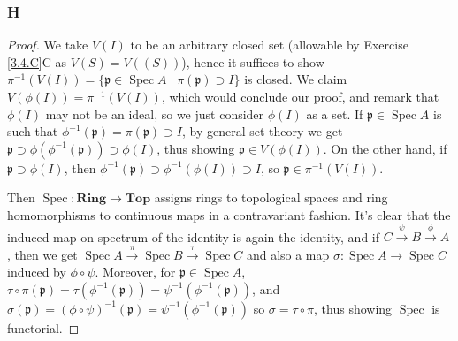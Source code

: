 \documentclass{article}
\newcommand{\frkp}{\mathfrak{p}}
\newcommand{\Ring}{\mathbf{Ring}} %
\newcommand{\Top}{\mathbf{Top}} %
\DeclareMathOperator{\Spec}{\mathrm{Spec}}
\begin{document}
\subsubsection{H}\label{3.4.H}
\begin{proof}
    We take $V(I)$ to be an arbitrary closed set (allowable by Exercise \ref{3.4.C}C as $V(S)=V((S))$), hence it suffices to show $\pi^{-1}(V(I))=\{\frkp \in \Spec A \mid \pi(\frkp)\supset I\}$ is closed. We claim $V(\phi(I))= \pi^{-1}(V(I))$, which would conclude our proof, and remark that $\phi(I)$ may not be an ideal, so we just consider $\phi(I)$ as a set. If $\frkp \in \Spec A$ is such that $\phi^{-1}(\frkp)=\pi(\frkp)\supset I$, by general set theory we get $\frkp \supset \phi(\phi^{-1}(\frkp))\supset \phi(I)$, thus showing $\frkp \in V(\phi(I))$. On the other hand, if $\frkp \supset \phi(I)$, then $\phi^{-1}(\frkp)\supset \phi^{-1}(\phi(I))\supset I$, so $\frkp \in \pi^{-1}(V(I))$.

    Then $\Spec:\Ring \to \Top$ assigns rings to topological spaces and ring homomorphisms to continuous maps in a contravariant fashion. It's clear that the induced map on spectrum of the identity is again the identity, and if $C\xrightarrow{\psi} B \xrightarrow{\phi} A$, then we get $\Spec A \xrightarrow{\pi} \Spec B \xrightarrow{\tau} \Spec C$ and also a map $\sigma:\Spec A \to \Spec C$ induced by $\phi \circ \psi$. Moreover, for $\frkp \in \Spec A$, $\tau \circ \pi(\frkp)=\tau(\phi^{-1}(\frkp))=\psi^{-1}(\phi^{-1}(\frkp))$, and $\sigma(\frkp)=(\phi \circ \psi)^{-1}(\frkp)=\psi^{-1}(\phi^{-1}(\frkp))$ so $\sigma = \tau \circ \pi$, thus showing $\Spec$ is functorial.
\end{proof}
\end{document}
